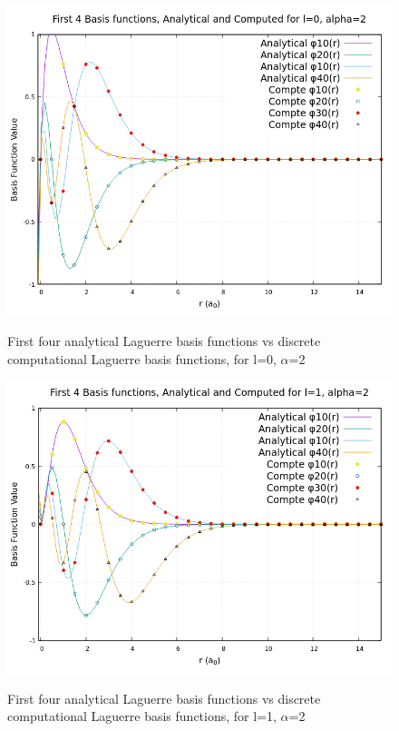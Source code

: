 \documentclass{article}
\begin{document}
    \begin{figure}[H]
    	\centering
    	\includegraphics[scale=0.62]{Images/l0a2.png}\\
    	\caption{First four analytical Laguerre basis functions vs discrete computational Laguerre basis functions, for l=0, $\alpha$=2}
    	\label{l0a2}
    \end{figure}
    \begin{figure}[H]
    	\centering
    	\includegraphics[scale=0.62]{Images/l1a2.png}\\
    	\caption{First four analytical Laguerre basis functions vs discrete computational Laguerre basis functions, for l=1, $\alpha$=2}
    	\label{l1a2}
    \end{figure}
    
\end{document}
